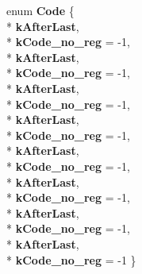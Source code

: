 \begin{DoxyCompactItemize}
\item 
enum {\bfseries Code} \{ \\*
{\bfseries k\+After\+Last}, 
\\*
{\bfseries k\+Code\+\_\+no\+\_\+reg} = -\/1, 
\\*
{\bfseries k\+After\+Last}, 
\\*
{\bfseries k\+Code\+\_\+no\+\_\+reg} = -\/1, 
\\*
{\bfseries k\+After\+Last}, 
\\*
{\bfseries k\+Code\+\_\+no\+\_\+reg} = -\/1, 
\\*
{\bfseries k\+After\+Last}, 
\\*
{\bfseries k\+Code\+\_\+no\+\_\+reg} = -\/1, 
\\*
{\bfseries k\+After\+Last}, 
\\*
{\bfseries k\+Code\+\_\+no\+\_\+reg} = -\/1, 
\\*
{\bfseries k\+After\+Last}, 
\\*
{\bfseries k\+Code\+\_\+no\+\_\+reg} = -\/1, 
\\*
{\bfseries k\+After\+Last}, 
\\*
{\bfseries k\+Code\+\_\+no\+\_\+reg} = -\/1, 
\\*
{\bfseries k\+After\+Last}, 
\\*
{\bfseries k\+Code\+\_\+no\+\_\+reg} = -\/1
 \}\hypertarget{structv8_1_1internal_1_1_register_adca23c370f4ac91047f79bd63778e75c}{}\label{structv8_1_1internal_1_1_register_adca23c370f4ac91047f79bd63778e75c}

\end{DoxyCompactItemize}
